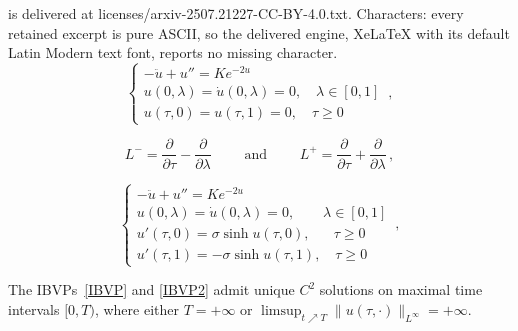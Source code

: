 \documentclass[10pt,a4paper]{amsart}
\begin{document}
is delivered at licenses/arxiv-2507.21227-CC-BY-4.0.txt. Characters: every retained excerpt is pure ASCII, so the delivered engine, XeLaTeX with its default Latin Modern text font, reports no missing character.
\begin{equation} \label{IBVP}
\begin{cases}
- \ddot{u} + u'' = K e^{- 2u} \\
u(0,\lambda)=\dot{u}(0,\lambda)=0, \quad \lambda \in [0,1] \\
u(\tau,0) = u(\tau,1) = 0, \quad \tau\geq 0
\end{cases} \, ,
\end{equation}

\begin{equation} \label{L+-}
L^- = \frac{\partial}{\partial \tau} - \frac{\partial}{\partial \lambda} \qquad \text{ and } \qquad L^+ = \frac{\partial}{\partial \tau} + \frac{\partial}{\partial \lambda} \, ,
\end{equation}

\begin{equation} \label{IBVP2}
\begin{cases}
- \ddot{u} + u'' = K e^{- 2u} \\
u(0,\lambda)=\dot{u}(0,\lambda)=0, \quad \quad \lambda \in [0,1] \\
u'(\tau,0) = \sigma \sinh u(\tau,0), \quad \,\,\,\, \tau\geq 0 \\
u'(\tau,1) = - \sigma \sinh u(\tau,1), \quad \tau\geq 0
\end{cases} \, ,
\end{equation}

\begin{Thm} \label{GWPBA}
The IBVPs~\eqref{IBVP} and \eqref{IBVP2} admit unique $C^2$ solutions on maximal time intervals $[0,T)$, where either $T = + \infty$ or $\limsup_{t {\scriptscriptstyle \nearrow} T} \| u(\tau, \cdot)\|_{L^\infty} = + \infty$.
\end{Thm}
\end{document}
